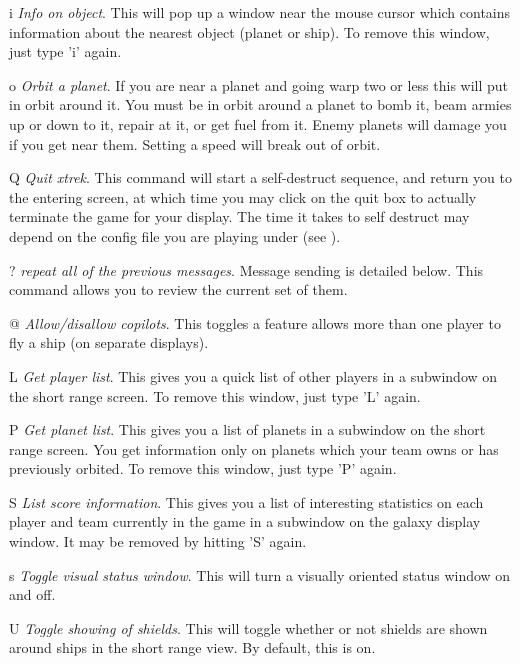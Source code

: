 \begin{list}{}{
	\renewcommand{\makelabel}[1]{{\tt #1 \hfill}}
         \setlength{\leftmargin}{.5in}
         \setlength{\labelwidth}{\leftmargin}
         \setlength{\labelsep}{0in}
}
\item[i]{\em Info on object}.
This will pop up a window near the mouse cursor which contains
information about the nearest object (planet or ship).
To remove this window, just type 'i' again.

\item[o]{\em Orbit a planet}.
If you are near a planet and going warp two or less this will put in
orbit around it.  You must be in orbit around a planet to bomb it, beam
armies up or down to it, repair at it, or get fuel from it.  Enemy
planets will damage you if you get near them.  Setting a speed will
break out of orbit.

\item[Q]{\em Quit xtrek}.
This command will start a self-destruct sequence, and return you to the
entering screen, at which time you may click on the quit box to actually
terminate the game for your display. The time it takes to self destruct may
depend on the config file you are playing under (see ).

\item[?]{\em repeat all of the previous messages}.
Message sending is detailed below.  This command allows you to
review the current set of them.

\item[@]{\em Allow/disallow copilots}.
This toggles a feature allows more than one player to fly a ship 
(on separate displays).

\item[L]{\em Get player list}.
This gives you a quick list of other players in a subwindow on
the short range screen.
To remove this window, just type 'L' again.

\item[P]{\em Get planet list}.
This gives you a list of planets in a subwindow on the short range
screen.
You get information only on planets which your team
owns or has previously orbited.  To remove this window,
just type 'P' again.

\item[S]{\em List score information}.
This gives you a list of interesting statistics on each player and
team currently in the game in a subwindow on the galaxy display window. 
It may be removed by hitting 'S' again.

\item[s]{\em Toggle visual status window}.
This will turn a visually oriented status window on and off.

\item[U]{\em Toggle showing of shields}.
This will toggle whether or not shields are shown around ships in the
short range view. By default, this is on.


\end{list}
